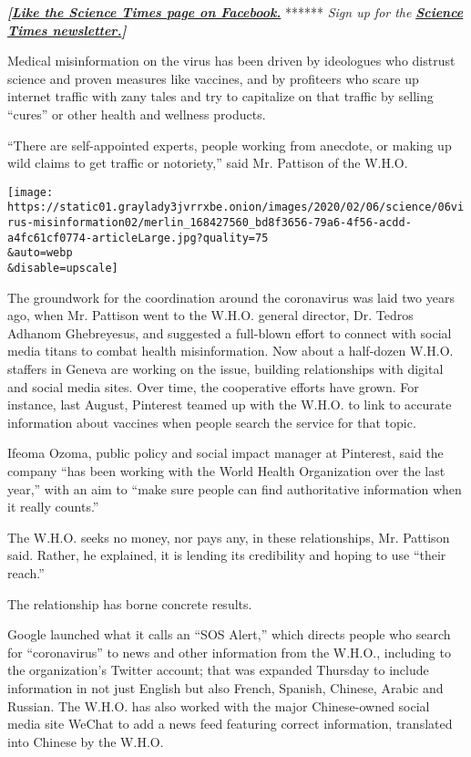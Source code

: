 \textbf{\emph{{[}}\href{http://on.fb.me/1paTQ1h}{\emph{Like the Science
Times page on Facebook.}}} ****** \emph{\textbar{} Sign up for the}
\textbf{\href{http://nyti.ms/1MbHaRU}{\emph{Science Times
newsletter.}}\emph{{]}}}

Medical misinformation on the virus has been driven by ideologues who
distrust science and proven measures like vaccines, and by profiteers
who scare up internet traffic with zany tales and try to capitalize on
that traffic by selling ``cures'' or other health and wellness products.

``There are self-appointed experts, people working from anecdote, or
making up wild claims to get traffic or notoriety,'' said Mr. Pattison
of the W.H.O.

\texttt{[image: https://static01.graylady3jvrrxbe.onion/images/2020/02/06/science/06virus-misinformation02/merlin\_168427560\_bd8f3656-79a6-4f56-acdd-a4fc61cf0774-articleLarge.jpg?quality=75\\\&auto=webp\\\&disable=upscale]}

The groundwork for the coordination around the coronavirus was laid two
years ago, when Mr. Pattison went to the W.H.O. general director, Dr.
Tedros Adhanom Ghebreyesus, and suggested a full-blown effort to connect
with social media titans to combat health misinformation. Now about a
half-dozen W.H.O. staffers in Geneva are working on the issue, building
relationships with digital and social media sites. Over time, the
cooperative efforts have grown. For instance, last August, Pinterest
teamed up with the W.H.O. to link to accurate information about vaccines
when people search the service for that topic.

Ifeoma Ozoma, public policy and social impact manager at Pinterest, said
the company ``has been working with the World Health Organization over
the last year,'' with an aim to ``make sure people can find
authoritative information when it really counts.''

The W.H.O. seeks no money, nor pays any, in these relationships, Mr.
Pattison said. Rather, he explained, it is lending its credibility and
hoping to use ``their reach.''

The relationship has borne concrete results.

Google launched what it calls an ``SOS Alert,'' which directs people who
search for ``coronavirus'' to news and other information from the
W.H.O., including to the organization's Twitter account; that was
expanded Thursday to include information in not just English but also
French, Spanish, Chinese, Arabic and Russian. The W.H.O. has also worked
with the major Chinese-owned social media site WeChat to add a news feed
featuring correct information, translated into Chinese by the W.H.O.


